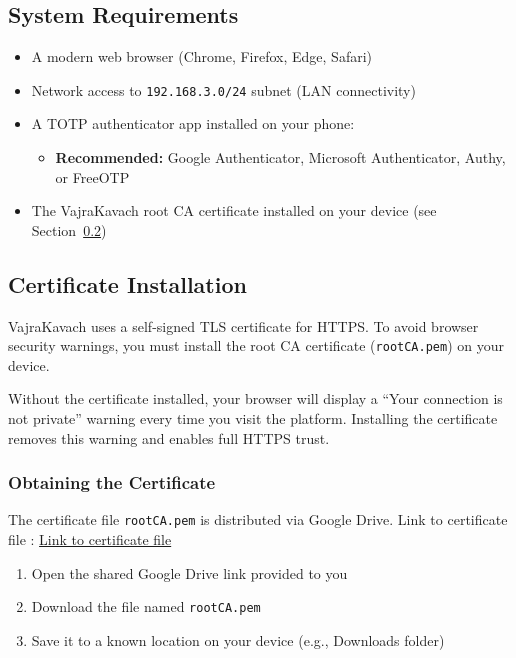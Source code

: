 \documentclass[12pt,a4paper]{article}
\begin{document}
\subsection{System Requirements}

\begin{itemize}[leftmargin=*]
  \item A modern web browser (Chrome, Firefox, Edge, Safari)
  \item Network access to \texttt{192.168.3.0/24} subnet (LAN connectivity)
  \item A TOTP authenticator app installed on your phone:
    \begin{itemize}
      \item \textbf{Recommended:} Google Authenticator, Microsoft Authenticator, Authy, or FreeOTP
    \end{itemize}
  \item The VajraKavach root CA certificate installed on your device (see Section~\ref{sec:cert-install})
\end{itemize}

\subsection{Certificate Installation}
\label{sec:cert-install}

VajraKavach uses a self-signed TLS certificate for HTTPS. To avoid browser security warnings, you must install the root CA certificate (\texttt{rootCA.pem}) on your device.

\begin{warnbox}
Without the certificate installed, your browser will display a ``Your connection is not private'' warning every time you visit the platform. Installing the certificate removes this warning and enables full HTTPS trust.
\end{warnbox}

\subsubsection{Obtaining the Certificate}

The certificate file \texttt{rootCA.pem} is distributed via Google Drive. Link to certificate file : \href{https://drive.google.com/file/d/1Eurorvse45uq3hAEmx7_i7uWV1wvFLag/view?usp=sharing}{Link to certificate file}


\begin{enumerate}
  \item Open the shared Google Drive link provided to you
  \item Download the file named \texttt{rootCA.pem}
  \item Save it to a known location on your device (e.g., Downloads folder)
\end{enumerate}
\end{document}

